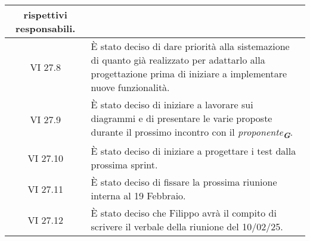 \begin{table}[htbp]
\begin{tabular}{|c|p{}|}
        rispettivi responsabili. \\
        \hline
        VI 27.8 & È stato deciso di dare priorità alla sistemazione di quanto già realizzato per adattarlo alla progettazione
        prima di iniziare a implementare nuove funzionalità. \\
        \hline
        VI 27.9 & È stato deciso di iniziare a lavorare sui diagrammi e di presentare le varie proposte durante il prossimo incontro
        con il \emph{proponente}\textsubscript{\textit{\textbf{G}}}. \\
        \hline
        VI 27.10 & È stato deciso di iniziare a progettare i test dalla prossima sprint. \\
        \hline
        VI 27.11 & È stato deciso di fissare la prossima riunione interna al 19 Febbraio. \\
        \hline
        VI 27.12 & È stato deciso che Filippo avrà il compito di scrivere il verbale della riunione del 10/02/25. \\
        \hline
    \end{tabular}
\end{table}
